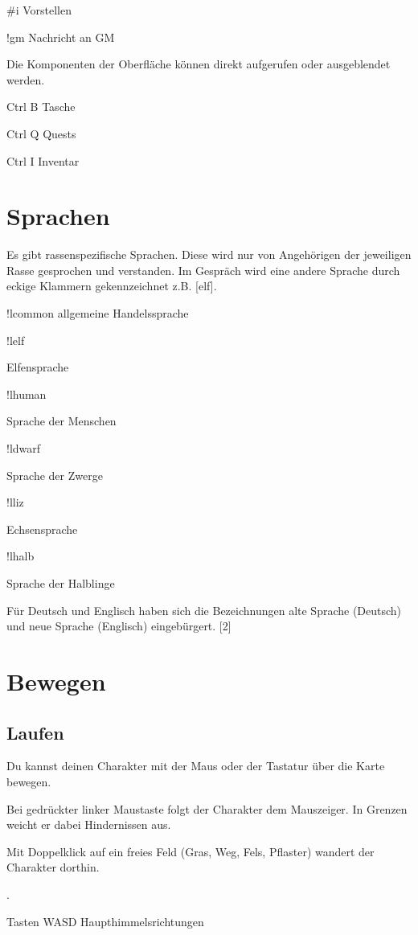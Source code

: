 \documentclass[a4paper,11pt]{book}
\begin{document}
\#i  Vorstellen

!gm  Nachricht an GM

Die Komponenten der Oberfläche können direkt aufgerufen oder ausgeblendet werden.

Ctrl B  Tasche

Ctrl Q  Quests

Ctrl I  Inventar

\section{Sprachen}

Es gibt rassenspezifische Sprachen. Diese wird nur von Angehörigen der jeweiligen Rasse gesprochen und verstanden. Im Gespräch wird eine andere Sprache durch eckige Klammern gekennzeichnet z.B. [elf].

!lcommon allgemeine Handelssprache

!lelf

Elfensprache

!lhuman

Sprache der Menschen

!ldwarf

Sprache der Zwerge

!lliz

Echsensprache

!lhalb

Sprache der Halblinge

Für Deutsch und Englisch haben sich die Bezeichnungen alte Sprache (Deutsch) und neue Sprache (Englisch) eingebürgert. [2]

\section{Bewegen}

\subsection{Laufen}

Du kannst deinen Charakter mit der Maus oder der Tastatur über die Karte bewegen.

Bei gedrückter linker Maustaste folgt der Charakter dem Mauszeiger. In Grenzen weicht er dabei Hindernissen aus.

Mit Doppelklick auf ein freies Feld (Gras, Weg, Fels, Pflaster) wandert der Charakter dorthin.

.

Tasten WASD  Haupthimmelsrichtungen
\end{document}
